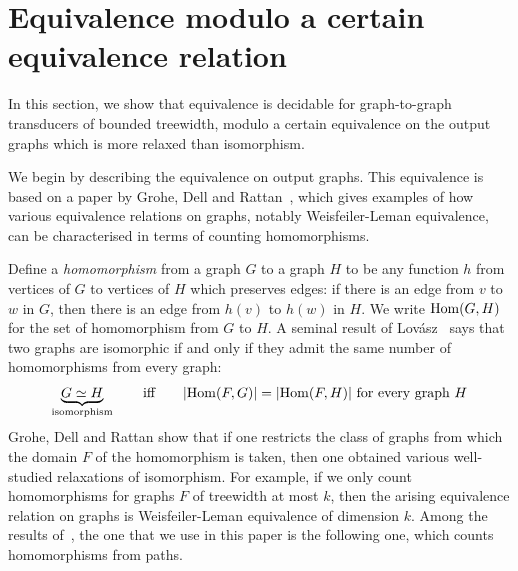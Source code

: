
\section{Equivalence  modulo a certain equivalence relation}
In this section, we show that equivalence is decidable for graph-to-graph transducers of bounded treewidth, modulo a certain equivalence on the output graphs which is more relaxed than isomorphism.  

 We begin by describing the equivalence on output graphs.
This equivalence is based on a paper by Grohe, Dell and Rattan~\cite{groheDellRattan2018}, which gives examples of how various equivalence relations on graphs, notably Weisfeiler-Leman equivalence, can be characterised in terms of counting homomorphisms. 

Define a \emph{homomorphism} from a graph $G$ to a graph $H$ to be any function $h$ from vertices of $G$ to vertices of $H$ which preserves edges: if there is an edge from $v$ to $w$ in $G$, then there is an edge from $h(v)$ to $h(w)$ in $H$. We write $\mathrm {Hom}(G,H)$ for the set of homomorphism from $G$ to $H$. A seminal result of  Lov\'asz~\cite[p.~326]{lovasz1967operations} says that two graphs are isomorphic if and only if they admit the same number of homomorphisms from every graph:
\begin{align*}
\underbrace{G \simeq H}_{\text{isomorphism}} \qquad \text{iff} \qquad  |\mathrm {Hom}(F,G)|=|\mathrm {Hom}(F,H)| \ \text{for every graph $H$}
\end{align*}
Grohe, Dell and Rattan show that if one restricts the class of graphs from which the domain $F$ of the homomorphism is taken, then one obtained various well-studied relaxations of isomorphism. For example, if we only count homomorphisms for graphs $F$ of treewidth at most $k$, then the arising equivalence relation on graphs is Weisfeiler-Leman equivalence of dimension $k$.  Among the results of~\cite{groheDellRattan2018}, the one that we use in this paper is the following one, which counts homomorphisms from paths.

